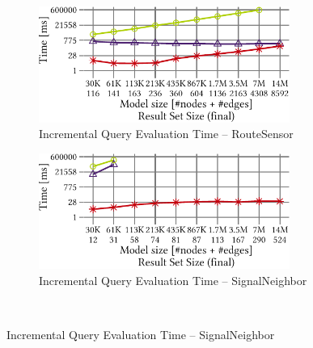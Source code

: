 \begin{figure}[ht]
\begin{center}
	\begin{subfigure}[t]{0.48\textwidth}\centering
	    \includegraphics[width=0.9\textwidth]{figures/trainBenchmark_User_SumInc_RouteSensor}
	    \caption{Incremental Query Evaluation Time -- RouteSensor}
	    \label{fig:SumInc_RouteSensor}
	\end{subfigure}
	\begin{subfigure}[t]{0.48\textwidth}\centering
	    \includegraphics[width=0.9\textwidth]{figures/trainBenchmark_User_SumInc_SignalNeighbor}
	    \caption{Incremental Query Evaluation Time -- SignalNeighbor}
	    \label{fig:SumInc_SignalNeighbor}
	\end{subfigure} \\


\end{center}
\end{figure}
